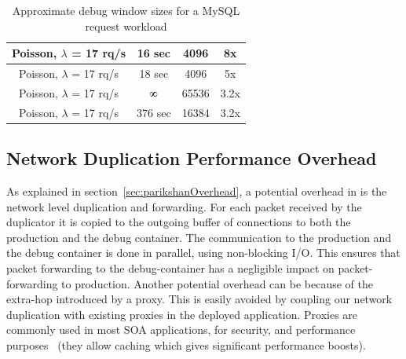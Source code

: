 \begin{table}[ht]
\begin{centering}
\begin{tabular}{|c|c|c|c|}
			Poisson, $\lambda$ = 17 rq/s                               & 16 sec                                                 & 4096                                                & 8x                        \\ \hline
			Poisson, $\lambda$ = 17 rq/s                               & 18 sec                                                 & 4096                                                & 5x                      \\ \hline
			Poisson, $\lambda$ = 17 rq/s                               & $\infinity$                                                    & 65536                                               & 3.2x \\ \hline
			Poisson, $\lambda$ = 17 rq/s                               & 376 sec                                                & 16384                                               & 3.2x \\ \hline
		\end{tabular}
		\captionsetup{justification=centering}
		\caption{Approximate debug window sizes for a MySQL request workload}
		\label{table:timewindow}
	\end{centering}
\end{table}
\fi


\subsection{Network Duplication Performance Overhead}
\label{sec:DupPerformanceOverhead}

As explained in section~\ref{sec:parikshanOverhead}, a potential overhead in \parikshan is the network level duplication and forwarding. 
For each packet received by the duplicator it is copied to the outgoing buffer of connections to both the production and the debug container. 
The communication to the production and the debug container is done in parallel, using non-blocking I/O. 
This ensures that packet forwarding to the debug-container has a negligible impact on packet-forwarding to production.
Another potential overhead can be because of the extra-hop introduced by a proxy. 
This is easily avoided by coupling our network duplication with existing proxies in the deployed application.
Proxies are commonly used in most SOA applications, for security, and performance purposes~\cite{squid} (they allow caching which gives significant performance boosts).


